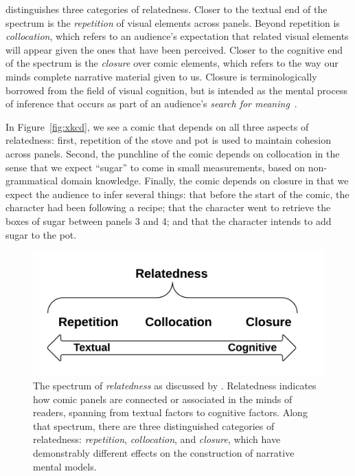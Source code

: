 \citeauthor{saraceni2016relatedness} distinguishes three categories of relatedness.
Closer to the textual end of the spectrum is the \emph{repetition} of visual
elements across panels. Beyond repetition is \emph{collocation}, which refers
to an audience's expectation that related visual elements will appear given the
ones that have been perceived. Closer to the cognitive end of the spectrum is
the \emph{closure} over comic elements, which refers to the way our minds 
complete narrative material given to us. Closure is terminologically borrowed 
from the field of visual cognition, but is intended as the mental process 
of inference that occurs as part of an audience's 
\emph{search for meaning}~\cite{gerrig1994readers}.

In Figure~\ref{fig:xkcd}, we see a comic that depends on all three aspects
of relatedness: first, repetition of the stove and pot is used to maintain
cohesion  across panels. Second, the punchline of
the comic depends on collocation in the sense that we expect ``sugar'' to
come in small measurements, based on non-grammatical domain knowledge.
Finally, the comic depends on closure in that we expect the audience to infer
several things: that before the start of the comic, the character had been
following a recipe; that the character went to retrieve the boxes of sugar
between panels 3 and 4; and that the character intends to add sugar to the
pot.


%
\begin{figure}
	\includegraphics[width=\columnwidth]{relatedness.png}
	\caption{
		The spectrum of \emph{relatedness} as discussed by
		. Relatedness indicates how 
		comic panels are connected or associated in the minds of 
		readers, spanning from textual factors to cognitive factors. 
		Along that spectrum, there are three  distinguished 
		categories of relatedness: \emph{repetition}, 
		\emph{collocation}, and \emph{closure}, which have
		demonstrably different effects on the construction of
		narrative mental models.
		}
	\label{figure:relatedness}
\end{figure}
%
%

